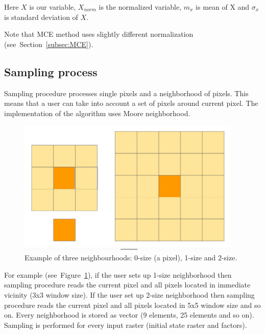 \documentclass{report}
\begin{document}
Here $X$ is our variable, $X_{norm}$ is the normalized variable, $m_{x}$ is mean of X and $\sigma _{x}$ is standard deviation of $X$. 

Note that MCE method uses slightly different normalization (see~Section~\ref{subsec:MCE}).


\subsection{Sampling process}\label{subsec:sampling}

Sampling procedure processes single pixels and a neighborhood of pixels.
This means that a user can take into account a set of pixels around current pixel.
The implementation of the algorithm uses Moore neighborhood.

\begin{figure}[h!]
\centering
\includegraphics[width=0.95\textwidth]{img/neighbourhood_example.png}
\caption{Example of three neighbourhoods: 0-size (a pixel), 1-size and 2-size.}
\label{fig:neighbourhood_example}
\end{figure}

For example (see~Figure~\ref{fig:neighbourhood_example}), if the user sets up 1-size neighborhood then sampling procedure reads the current pixel and all pixels located in immediate vicinity (3x3 window size). If the user set up 2-size neighborhood then sampling procedure reads the current pixel and all pixels located in 5x5 window size and so on. Every neighborhood is stored as vector (9 elements, 25 elements and so on). Sampling is performed for every input raster (initial state raster and factors).
\end{document}
